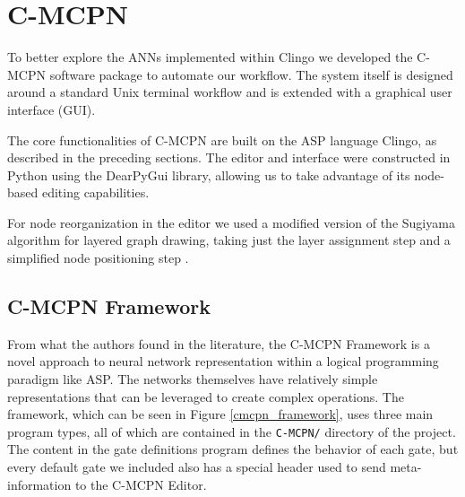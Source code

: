 \section{C-MCPN}

To better explore the ANNs implemented within Clingo we developed the C-MCPN software package to automate our workflow. The system itself is designed around a standard Unix terminal workflow and is extended with a graphical user interface (GUI).

The core functionalities of C-MCPN are built on the ASP language Clingo, as described in the preceding sections. The editor and interface were constructed in Python using the DearPyGui library, allowing us to take advantage of its node-based editing capabilities.


For node reorganization in the editor we used a modified version of the Sugiyama algorithm for layered graph drawing, taking just the layer assignment step and a simplified node positioning step \cite{Sugiyama1981}.

\subsection{C-MCPN Framework}

From what the authors found in the literature, the C-MCPN Framework is a novel approach to neural network representation within a logical programming paradigm like ASP. The networks themselves have relatively simple representations that can be leveraged to create complex operations. The framework, which can be seen in Figure \ref{cmcpn_framework}, uses three main program types, all of which are contained in the \texttt{C-MCPN/} directory of the project. The content in the gate definitions program defines the behavior of each gate, but every default gate we included also has a special header used to send meta-information to the C-MCPN Editor.

